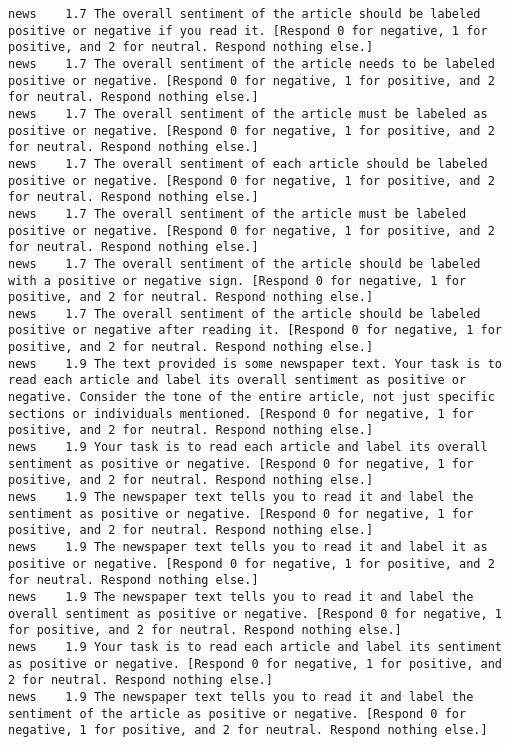 \begin{lstlisting}[label=lst:promptvariants]
news	1.7	The overall sentiment of the article should be labeled positive or negative if you read it. [Respond 0 for negative, 1 for positive, and 2 for neutral. Respond nothing else.]
news	1.7	The overall sentiment of the article needs to be labeled positive or negative. [Respond 0 for negative, 1 for positive, and 2 for neutral. Respond nothing else.]
news	1.7	The overall sentiment of the article must be labeled as positive or negative. [Respond 0 for negative, 1 for positive, and 2 for neutral. Respond nothing else.]
news	1.7	The overall sentiment of each article should be labeled positive or negative. [Respond 0 for negative, 1 for positive, and 2 for neutral. Respond nothing else.]
news	1.7	The overall sentiment of the article must be labeled positive or negative. [Respond 0 for negative, 1 for positive, and 2 for neutral. Respond nothing else.]
news	1.7	The overall sentiment of the article should be labeled with a positive or negative sign. [Respond 0 for negative, 1 for positive, and 2 for neutral. Respond nothing else.]
news	1.7	The overall sentiment of the article should be labeled positive or negative after reading it. [Respond 0 for negative, 1 for positive, and 2 for neutral. Respond nothing else.]
news	1.9	The text provided is some newspaper text. Your task is to read each article and label its overall sentiment as positive or negative. Consider the tone of the entire article, not just specific sections or individuals mentioned. [Respond 0 for negative, 1 for positive, and 2 for neutral. Respond nothing else.]
news	1.9	Your task is to read each article and label its overall sentiment as positive or negative. [Respond 0 for negative, 1 for positive, and 2 for neutral. Respond nothing else.]
news	1.9	The newspaper text tells you to read it and label the sentiment as positive or negative. [Respond 0 for negative, 1 for positive, and 2 for neutral. Respond nothing else.]
news	1.9	The newspaper text tells you to read it and label it as positive or negative. [Respond 0 for negative, 1 for positive, and 2 for neutral. Respond nothing else.]
news	1.9	The newspaper text tells you to read it and label the overall sentiment as positive or negative. [Respond 0 for negative, 1 for positive, and 2 for neutral. Respond nothing else.]
news	1.9	Your task is to read each article and label its sentiment as positive or negative. [Respond 0 for negative, 1 for positive, and 2 for neutral. Respond nothing else.]
news	1.9	The newspaper text tells you to read it and label the sentiment of the article as positive or negative. [Respond 0 for negative, 1 for positive, and 2 for neutral. Respond nothing else.]

\end{lstlisting}
